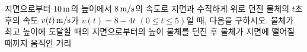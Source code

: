 지면으로부터 $10\mkern3mu \mathrm{m}$의 높이에서 $8\mkern3mu \mathrm{m/s}$의 속도로 지면과 수직하게 위로 던진 물체의 $t$초 후의 속도 $v(t)\mkern3mu \mathrm{m/s}$가 $v(t)=8-4t$ $(0\le t\le 5)$일 때, 다음을 구하시오.
 물체가 최고 높이에 도달할 때의 지면으로부터의 높이
 물체를 던진 후 물체가 지면에 떨어질 때까지 움직인 거리
